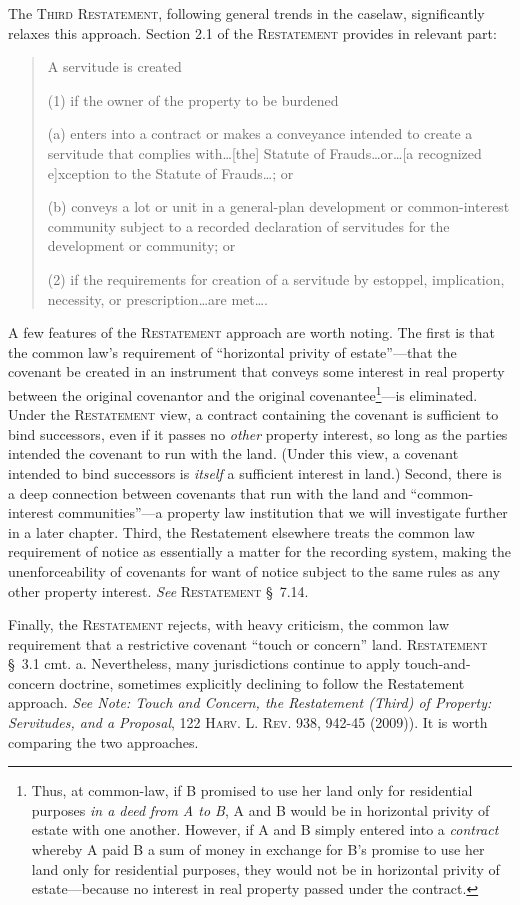 The \textsc{Third Restatement}, following general trends in the caselaw,
significantly relaxes this approach. Section 2.1 of the \textsc{Restatement}
provides in relevant part:
\begin{quotation}
A servitude is created

(1) if the owner of the property to be burdened
\begin{statute}
\item (a) enters into a contract or makes a conveyance intended to create a
servitude that complies with\ldots [the] Statute of Frauds\ldots or\ldots [a
recognized e]xception to the Statute of Frauds\ldots ; or

\item (b) conveys a lot or unit in a general-plan development or common-interest
community subject to a recorded declaration of servitudes for the development or
community; or
\end{statute}
(2) if the requirements for creation of a servitude by estoppel, implication,
necessity, or prescription\ldots are met\ldots .
\end{quotation}
A few features of the \textsc{Restatement} approach are worth noting. The first
is that
the common law's requirement of ``horizontal privity of estate''---that the
covenant be created in an instrument that conveys some interest in real property
between the original covenantor and the original covenantee\footnote{Thus, at
common-law, if B promised to use her land only for residential purposes
\textit{in a deed} \textit{from A to B}, A and B would be in horizontal privity
of estate with one another. However, if A and B simply entered into a
\textit{contract} whereby A paid B a sum of money in exchange for B's promise to
use her land only for residential purposes, they would not be in horizontal
privity of estate---because no interest in real property passed under the
contract.}---is eliminated. Under the \textsc{Restatement} view, a contract
containing
the covenant is sufficient to bind successors, even if it passes no
\textit{other} property interest, so long as the parties intended the covenant
to run with the land. (Under this view, a covenant intended to bind successors
is \textit{itself} a sufficient interest in land.) Second, there is a deep
connection between covenants that run with the land and ``common-interest
communities''---a property law institution that we will investigate further in a
later chapter. Third, the Restatement elsewhere treats the common law
requirement of notice as essentially a matter for the recording system, making
the unenforceability of covenants for want of notice subject to the same rules
as any other property interest. \emph{See} \textsc{Restatement} \S~7.14.

Finally, the \textsc{Restatement} rejects, with heavy criticism, the common law
requirement that a restrictive covenant ``touch or concern'' land.
\textsc{Restatement} \S~3.1 cmt. a. Nevertheless, many jurisdictions continue
to apply touch-and-concern doctrine, sometimes explicitly declining to follow
the Restatement approach. \textit{See Note: Touch and Concern, the Restatement
(Third) of Property: Servitudes, and a Proposal}, 122 \textsc{Harv. L. Rev.}
938, 942-45 (2009)). It is worth comparing the two approaches.

